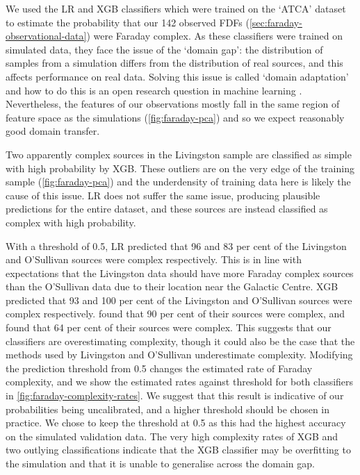 \documentclass[11pt, a4paper]{book}
\begin{document}
    We used the LR and XGB classifiers which were trained on the `ATCA' dataset to estimate the probability that our 142 observed FDFs (\autoref{sec:faraday-observational-data}) were Faraday complex. As these classifiers were trained on simulated data, they face the issue of the `domain gap': the distribution of samples from a simulation differs from the distribution of real sources, and this affects performance on real data. Solving this issue is called `domain adaptation' and how to do this is an open research question in machine learning \citep{zhang2019transfer,pan10transfer}. Nevertheless, the features of our observations mostly fall in the same region of feature space as the simulations (\autoref{fig:faraday-pca}) and so we expect reasonably good domain transfer.

    Two apparently complex sources in the Livingston sample are classified as simple with high probability by XGB. These outliers are on the very edge of the training sample (\autoref{fig:faraday-pca}) and the underdensity of training data here is likely the cause of this issue. LR does not suffer the same issue, producing plausible predictions for the entire dataset, and these sources are instead classified as complex with high probability.

    With a threshold of 0.5, LR predicted that 96 and 83 per cent of the Livingston and O'Sullivan sources were complex respectively. This is in line with expectations that the Livingston data should have more Faraday complex sources than the O'Sullivan data due to their location near the Galactic Centre. XGB predicted that 93 and 100 per cent of the Livingston and O'Sullivan sources were complex respectively. \citet{livingston21faraday} found that 90 per cent of their sources were complex, and \citet{osullivan_broad-band_2017} found that 64 per cent of their sources were complex. This suggests that our classifiers are overestimating complexity, though it could also be the case that the methods used by Livingston and O'Sullivan underestimate complexity. Modifying the prediction threshold from 0.5 changes the estimated rate of Faraday complexity, and we show the estimated rates against threshold for both classifiers in \autoref{fig:faraday-complexity-rates}. We suggest that this result is indicative of our probabilities being uncalibrated, and a higher threshold should be chosen in practice. We chose to keep the threshold at 0.5 as this had the highest accuracy on the simulated validation data. The very high complexity rates of XGB and two outlying classifications indicate that the XGB classifier may be overfitting to the simulation and that it is unable to generalise across the domain gap.
\end{document}
